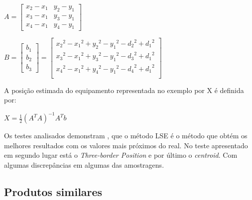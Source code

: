 \begin{center}



$A=\begin{bmatrix}
x_{2}-x_{1} & y_{2}-y_{1}\\
x_{3}-x_{1} & y_{3}-y_{1}\\
x_{4}-x_{1} & y_{4}-y_{1}
\end{bmatrix}$

$B=\begin{bmatrix}
b_{1}\\
b_{2}\\
b_{3}
\end{bmatrix}=\begin{bmatrix}
{x_{2}}^2-{x_{1}}^2 + {y_{2}}^2-{y_{1}}^2 - {d_{2}}^2 + {d_{1}}^2 \\
{x_{3}}^2-{x_{1}}^2 + {y_{3}}^2-{y_{1}}^2 - {d_{3}}^2 + {d_{1}}^2 \\
{x_{4}}^2-{x_{1}}^2 + {y_{4}}^2-{y_{1}}^2 - {d_{4}}^2 + {d_{1}}^2 \\
\end{bmatrix} $

\end{center}

\par A posição estimada do equipamento representada no exemplo por X é definida por:



\par
\begin{center}
$ X= \frac{1}{2}(A^T A)^{-1} A^T b$
\end{center}

\par Os testes analisados demonstram\cite{Wang2013} , que o método LSE é o método que obtém os melhores resultados com os valores mais próximos do real. No teste apresentado em segundo lugar está o \textit{Three-border Position} e por último o \textit{centroid}. Com algumas discrepâncias em algumas das amostragens.

\subsection{Produtos similares} \label{produtos}

